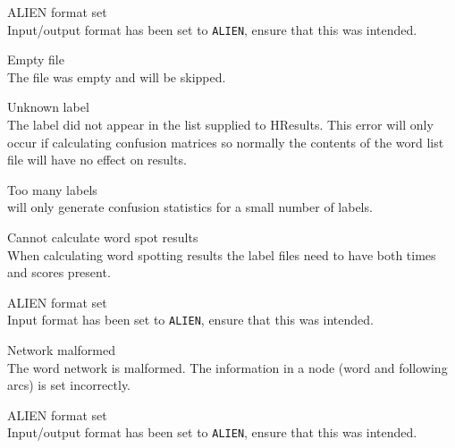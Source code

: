 \begin{itemize}
\begin{itemize}
    ALIEN format set\\
        Input/output format has been set to \texttt{ALIEN}, ensure that 
        this was intended.

\end{itemize}


\begin{itemize}
    Empty file\\
        The file was empty and will be skipped.

    Unknown label\\
        The label did not appear in the list supplied to HResults.
        This error will only occur if calculating confusion matrices so 
        normally the contents of the word list file will have no effect 
        on results.

    Too many labels\\
         will only generate confusion statistics for a small 
        number of labels.

 Cannot calculate word spot results\\
        When calculating word spotting results the label files need to have 
        both times and scores present.

    ALIEN format set\\
        Input format has been set to \texttt{ALIEN}, ensure that this was 
        intended.

\end{itemize}


\begin{itemize}
    Network malformed\\
        The word network is malformed. The information in a node (word
        and following arcs) is set incorrectly.

\end{itemize}


\begin{itemize}

    ALIEN format set\\
        Input/output format has been set to \texttt{ALIEN}, ensure that 
        this was intended.

\end{itemize}


\end{itemize}
